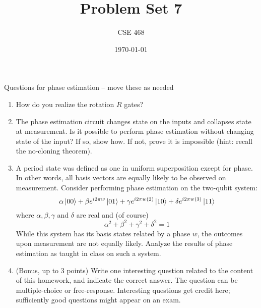 \documentclass[12pt]{article}
\title{Problem Set 7}
\author{CSE 468}
\date{\today}
\begin{document}
\maketitle


Questions for phase estimation -- move these as needed

\begin{enumerate}[font=\bfseries]
    \item How do you realize the rotation $R$ gates?
    \item The phase estimation circuit changes state on the inputs and collapses state at measurement.  Is it possible to perform phase estimation without changing state of the input?  If so, show how. If not, prove it is impossible (hint:  recall the no-cloning theorem).
    \item A period state was defined as one in uniform superposition except for phase.  In other words, all basis vectors are equally likely to be observed on measurement.  Consider performing phase estimation on the two-qubit system:
    \[ \alpha\ket{00} + \beta e^{i 2\pi w}\ket{01} 
        + \gamma e^{i 2\pi w(2)}\ket{10} + \delta e^{i 2\pi w(3)}\ket{11}
    \]
    where $\alpha, \beta, \gamma$ and $\delta$ are real and (of course)
    \[ \alpha^{2} + \beta^{2} + \gamma^{2} + \delta^{2}=1 \]
    While this system has its basis states related by a phase $w$, the outcomes upon measurement are not equally likely.  Analyze the results of phase estimation as taught in class on such a system.
    \item (Bonus, up to 3 points) Write one interesting question related to the content of this homework, and indicate the correct answer. The question can be multiple-choice or free-response.  Interesting questions get credit here;  sufficiently good questions might appear on an exam.
    
\end{enumerate}
\end{document}
